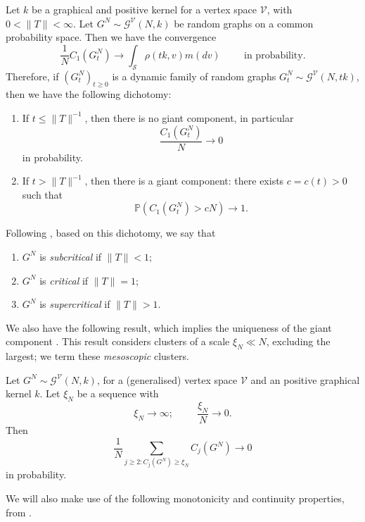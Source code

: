    \begin{theorem}\label{thrm: RG1} Let $k$ be a graphical and positive kernel for a vertex space $\mathcal{V}$, with $0<\|T\|< \infty.$ Let $G^N\sim \mathcal{G}^\mathcal{V}(N, k)$ be random graphs on a common probability space. Then we have the convergence \begin{equation}
       \frac{1}{N}C_1(G^N_t)\rightarrow \int_{\mathcal{S}} \rho(tk, v) m(dv) \hspace{1cm} \text{in probability.}
   \end{equation}
   Therefore, if $(G^N_t)_{t\geq 0}$ is a dynamic family of random graphs $
       G^N_t \sim \mathcal{G}^\mathcal{V}(N, tk)$, then we have the following dichotomy:  \begin{enumerate}[label=\roman{*}).]
       \item If $t\leq \|T\|^{-1}$, then there is no giant component, in particular \begin{equation}
           \frac{C_1(G^N_t)}{N} \rightarrow 0
       \end{equation} in probability.
       \item If $t>\|T\|^{-1}$, then there is a giant component: there exists $c=c(t)>0$ such that
       \begin{equation}
           \mathbb{P}(C_1(G^N_t)>cN)\rightarrow 1.
       \end{equation}
   \end{enumerate}\end{theorem}
   \begin{remark} Following \cite{BJR07}, based on this dichotomy, we say that \begin{enumerate}[label=\roman{*}).]
       \item $G^N$ is \emph{subcritical} if $\|T\|<1;$
       \item $G^N$ is \emph{critical} if $\|T\|=1;$
       \item $G^N$ is \emph{supercritical} if $\|T\|>1.$
   \end{enumerate} \end{remark} We also have the following result, which implies the uniqueness of the giant component \cite[Theorem 3.6]{BJR07}. This result considers clusters of a scale $\xi_N\ll N$, excluding the largest; we term these \emph{mesoscopic} clusters.
   \begin{theorem}\label{thrm: RG2} Let $G^N\sim \mathcal{G}^\mathcal{V}(N, k)$, for a (generalised) vertex space $\mathcal{V}$ and an positive graphical kernel $k$. Let $\xi_N$ be a sequence with  \begin{equation}
       \xi_N\rightarrow \infty; \hspace{1cm} \frac{\xi_N}{N}\rightarrow 0.
   \end{equation} Then \begin{equation}
       \frac{1}{N}\sum_{j\geq 2: C_j(G^N)\geq \xi_N}C_j(G^N) \rightarrow 0
   \end{equation} in probability. \end{theorem}   We will also make use of the following monotonicity and continuity properties, from \cite[Theorem 6.4]{BJR07}.
